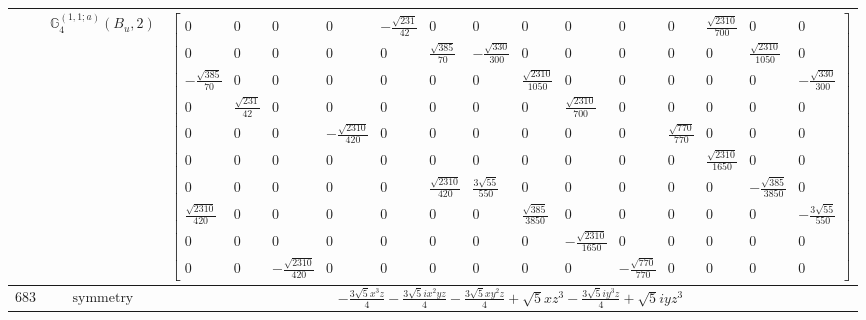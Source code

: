 \documentclass[fleqn,8pt,landscape]{jsarticle}
\begin{document}
\begin{longtable}{ccc}
$  $ & $ \mathbb{G}_{4}^{(1,1;a)}(B_{u},2) $ & $ \begin{bmatrix} 0 & 0 & 0 & 0 & - \frac{\sqrt{231}}{42} & 0 & 0 & 0 & 0 & 0 & 0 & \frac{\sqrt{2310}}{700} & 0 & 0 \\ 0 & 0 & 0 & 0 & 0 & \frac{\sqrt{385}}{70} & - \frac{\sqrt{330}}{300} & 0 & 0 & 0 & 0 & 0 & \frac{\sqrt{2310}}{1050} & 0 \\ - \frac{\sqrt{385}}{70} & 0 & 0 & 0 & 0 & 0 & 0 & \frac{\sqrt{2310}}{1050} & 0 & 0 & 0 & 0 & 0 & - \frac{\sqrt{330}}{300} \\ 0 & \frac{\sqrt{231}}{42} & 0 & 0 & 0 & 0 & 0 & 0 & \frac{\sqrt{2310}}{700} & 0 & 0 & 0 & 0 & 0 \\ 0 & 0 & 0 & - \frac{\sqrt{2310}}{420} & 0 & 0 & 0 & 0 & 0 & 0 & \frac{\sqrt{770}}{770} & 0 & 0 & 0 \\ 0 & 0 & 0 & 0 & 0 & 0 & 0 & 0 & 0 & 0 & 0 & \frac{\sqrt{2310}}{1650} & 0 & 0 \\ 0 & 0 & 0 & 0 & 0 & \frac{\sqrt{2310}}{420} & \frac{3 \sqrt{55}}{550} & 0 & 0 & 0 & 0 & 0 & - \frac{\sqrt{385}}{3850} & 0 \\ \frac{\sqrt{2310}}{420} & 0 & 0 & 0 & 0 & 0 & 0 & \frac{\sqrt{385}}{3850} & 0 & 0 & 0 & 0 & 0 & - \frac{3 \sqrt{55}}{550} \\ 0 & 0 & 0 & 0 & 0 & 0 & 0 & 0 & - \frac{\sqrt{2310}}{1650} & 0 & 0 & 0 & 0 & 0 \\ 0 & 0 & - \frac{\sqrt{2310}}{420} & 0 & 0 & 0 & 0 & 0 & 0 & - \frac{\sqrt{770}}{770} & 0 & 0 & 0 & 0 \end{bmatrix} $ \\ \hline
$ 683 $ & $ \text{symmetry} $ & $ - \frac{3 \sqrt{5} x^{3} z}{4} - \frac{3 \sqrt{5} i x^{2} y z}{4} - \frac{3 \sqrt{5} x y^{2} z}{4} + \sqrt{5} x z^{3} - \frac{3 \sqrt{5} i y^{3} z}{4} + \sqrt{5} i y z^{3} $ \\

\end{longtable}
\end{document}
